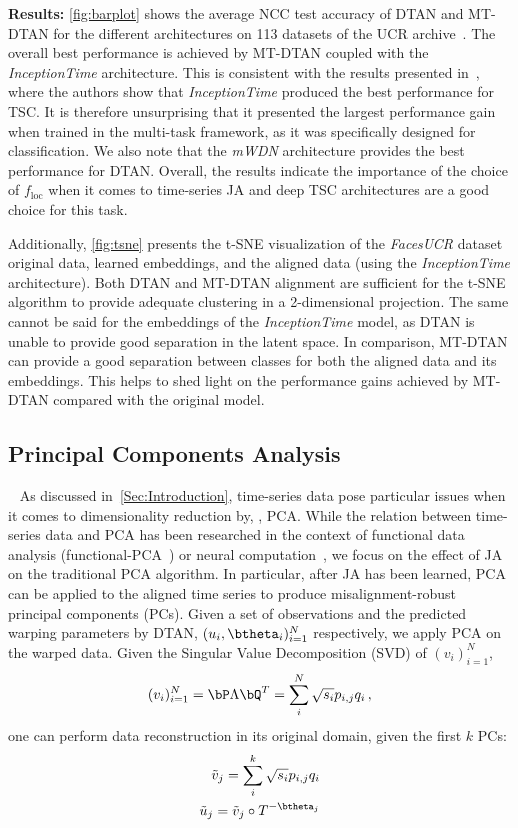 \textbf{Results:} 
\autoref{fig:barplot} shows the average NCC test accuracy of DTAN and MT-DTAN for the different architectures on 113 datasets of the 
UCR archive~\cite{Dau:2019:ucr}.  The overall 
best performance is achieved by MT-DTAN coupled with the \emph{InceptionTime} architecture. 
This is consistent with the results presented in~\cite{Ismail:2020:inceptiontime}, where the authors show that 
\emph{InceptionTime} produced the best performance for TSC. It is therefore unsurprising that 
it presented the largest performance gain when trained in the multi-task framework, as it was specifically designed
for classification. We also note that the \emph{mWDN} architecture provides the best performance for DTAN. Overall, the results indicate the importance of the choice of $f_{\mathrm{loc}}$ when it comes to time-series JA and deep TSC architectures are a good choice for this task.

Additionally, \autoref{fig:tsne} presents the t-SNE visualization of the \textit{FacesUCR} dataset
 original data, learned embeddings, and the aligned data (using the \emph{InceptionTime} architecture).
Both DTAN and MT-DTAN alignment are sufficient for the t-SNE algorithm to provide 
adequate clustering in a 2-dimensional projection. The same cannot be said for the embeddings of the \emph{InceptionTime} model, 
as DTAN is unable to provide good separation in the latent space. In comparison, MT-DTAN can provide a good 
separation between classes for both the aligned data and its embeddings. This helps to shed light on the 
performance gains achieved by MT-DTAN compared with the original model. 

\subsection{Principal Components Analysis}~\label{Sec:Results:sub:PCA}
As discussed in~\autoref{Sec:Introduction}, time-series data pose particular issues when it comes to 
dimensionality reduction by, \eg, PCA.
While the relation between time-series data and PCA has been researched in the context of functional data analysis 
(\eg functional-PCA~\cite{dauxois:1982:asymptotic, ramsay:1991:some}) or neural computation~\cite{williams:2020:twpca}, we focus on the effect of JA
on the traditional PCA algorithm.
In particular, after JA has been learned, PCA can 
be applied to the aligned time series to produce misalignment-robust principal components (PCs).
Given a set of observations and the predicted warping parameters by DTAN, $(u_i,\btheta_i)_{i=1}^N$ respectively, 
we apply PCA on the warped data.
Given the Singular Value Decomposition (SVD) of $(v_i)_{i=1}^N$, 
\begin{align}
    (v_i)_{i=1}^N = \bP\Lambda \bQ^T= \sum_{i}^{N}\sqrt{s_i}p_{i,j}q_i\, ,
\end{align}
one can perform data reconstruction in its original domain, given the first $k$ PCs: 
\begin{align}  
    \tilde{v}_j=\sum_{i}^{k}\sqrt{s_i}p_{i,j}q_i \\
    \tilde{u}_j=\tilde{v}_j\circ {T^{-\btheta_j}}
\end{align} 

